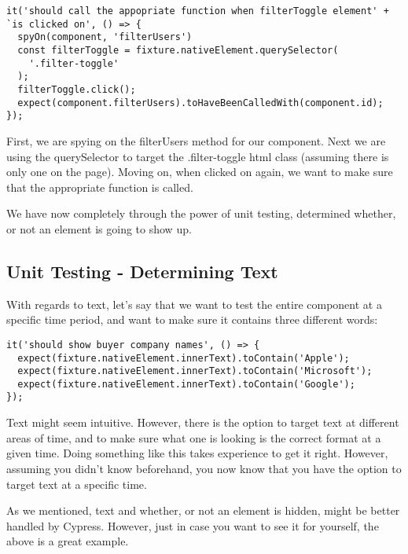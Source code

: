\begin{lstlisting}
it('should call the appopriate function when filterToggle element' +
`is clicked on', () => {
  spyOn(component, 'filterUsers')
  const filterToggle = fixture.nativeElement.querySelector(
    '.filter-toggle'
  );
  filterToggle.click();
  expect(component.filterUsers).toHaveBeenCalledWith(component.id);
});
\end{lstlisting}

First, we are spying on the filterUsers method for our component. Next we are
using the querySelector to target the .filter-toggle html class (assuming there
is only one on the page). Moving on, when clicked on again, we want to make sure
that the appropriate function is called.

We have now completely through the power of unit testing, determined whether, or
not an element is going to show up.

\subsection{ Unit Testing - Determining Text }
With regards to text, let's say that we want to test the entire component at a
specific time period, and want to make sure it contains three different words:
\begin{lstlisting}
it('should show buyer company names', () => {
  expect(fixture.nativeElement.innerText).toContain('Apple');
  expect(fixture.nativeElement.innerText).toContain('Microsoft');
  expect(fixture.nativeElement.innerText).toContain('Google');
});
\end{lstlisting}

Text might seem intuitive. However, there is the option to target text at
different areas of time, and to make sure what one is looking is the correct
format at a given time. Doing something like this takes experience to get it
right. However, assuming you didn't know beforehand, you now know that you have
the option to target text at a specific time.

As we mentioned, text and whether, or not an element is hidden, might be better
handled by Cypress. However, just in case you want to see it for yourself, the
above is a great example.
